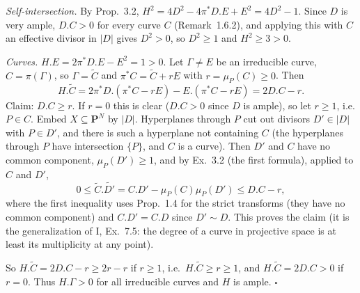\documentclass[11pt]{article}
\begin{document}
\emph{Self-intersection.} By Prop.~3.2, $H^2=4D^2-4\pi^*D.E+E^2=4D^2-1$. Since $D$ is very ample, $D.C>0$ for every curve $C$ (Remark~1.6.2), and applying this with $C$ an effective divisor in $|D|$ gives $D^2>0$, so $D^2\ge1$ and $H^2\ge3>0$.

\emph{Curves.} $H.E=2\pi^*D.E-E^2=1>0$. Let $\Gamma\ne E$ be an irreducible curve, $C=\pi(\Gamma)$, so $\Gamma=\widetilde C$ and $\pi^*C=\widetilde C+rE$ with $r=\mu_P(C)\ge0$. Then
\[
H.\widetilde C=2\pi^*D.(\pi^*C-rE)-E.(\pi^*C-rE)=2D.C-r .
\]
Claim: $D.C\ge r$. If $r=0$ this is clear ($D.C>0$ since $D$ is ample), so let $r\ge1$, i.e. $P\in C$. Embed $X\subseteq\mathbf P^N$ by $|D|$. Hyperplanes through $P$ cut out divisors $D'\in|D|$ with $P\in D'$, and there is such a hyperplane not containing $C$ (the hyperplanes through $P$ have intersection $\{P\}$, and $C$ is a curve). Then $D'$ and $C$ have no common component, $\mu_P(D')\ge1$, and by Ex.~3.2 (the first formula), applied to $C$ and $D'$,
\[
0\le\widetilde C.\widetilde{D'}=C.D'-\mu_P(C)\mu_P(D')\le D.C-r,
\]
where the first inequality uses Prop.~1.4 for the strict transforms (they have no common component) and $C.D'=C.D$ since $D'\sim D$. This proves the claim (it is the generalization of I, Ex.~7.5: the degree of a curve in projective space is at least its multiplicity at any point).

So $H.\widetilde C=2D.C-r\ge 2r-r$ if $r\ge1$, i.e.\ $H.\widetilde C\ge r\ge1$, and $H.\widetilde C=2D.C>0$ if $r=0$. Thus $H.\Gamma>0$ for all irreducible curves and $H$ is ample. \hfill$\square$
\end{document}

